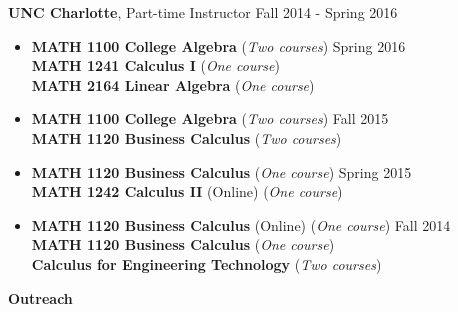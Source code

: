 \documentclass[letterpaper,10pt]{article}
\newcommand{\resheading}[1]{{\large \colorbox{mygrey}{\begin{minipage}{\textwidth}{\textbf{#1 \vphantom{p\^{E}}}}\end{minipage}}}}
\begin{document}
{\large{\textbf{UNC Charlotte}, Part-time Instructor \hfill Fall 2014 - Spring 2016}
\vspace{0.1cm}

\normalsize


\begin{itemize}
\item \textbf{MATH 1100 College Algebra} (\textit{Two
	courses}) \hfill Spring 2016 \\ \textbf{MATH 1241
Calculus I} (\textit{One course}) \\ \textbf{MATH 2164
Linear Algebra} (\textit{One course}) 
\end{itemize}

\begin{itemize}
\item \textbf{MATH 1100 College Algebra}  
(\textit{Two courses}) \hfill Fall 2015 \\
\textbf{MATH 1120 Business Calculus}
(\textit{Two courses})
\end{itemize}

\begin{itemize}
\item \textbf{MATH 1120 Business Calculus} 
    (\textit{One course}) \hfill Spring 2015 \\
    \textbf{MATH 1242 Calculus II} (Online)
    (\textit{One course})
\end{itemize}

\begin{itemize}
    \item \textbf{MATH 1120 Business Calculus} (Online)
	  (\textit{One course}) \hfill Fall 2014 \\
    \textbf{MATH 1120 Business Calculus} (\textit{One
    course}) \\
    \textbf{Calculus for Engineering Technology}
    (\textit{Two courses})
\end{itemize}

%
%

\vspace{0.5cm}


\resheading{Outreach}

}
\end{document}
